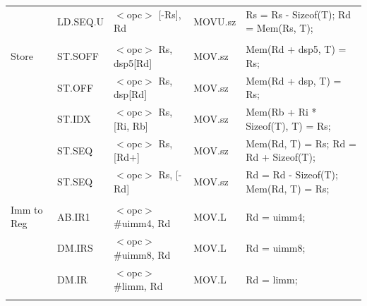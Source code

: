 \begin{table}
\begin{center}
\begin{tabular}{lllll}
                   & LD.SEQ.U          & $<$opc$>$ [-Rs], Rd                   & MOVU.sz           & Rs = Rs - Sizeof(T); Rd = Mem(Rs, T);                                         \\
                   &                   &                                       &                   &                                                                               \\
Store              & ST.SOFF           & $<$opc$>$ Rs, dsp5[Rd]                & MOV.sz            & Mem(Rd + dsp5, T) = Rs;                                                       \\
                   & ST.OFF            & $<$opc$>$ Rs, dsp[Rd]                 & MOV.sz            & Mem(Rd + dsp, T) = Rs;                                                        \\
                   & ST.IDX            & $<$opc$>$ Rs, [Ri, Rb]                & MOV.sz            & Mem(Rb + Ri * Sizeof(T), T) = Rs;                                             \\
                   & ST.SEQ            & $<$opc$>$ Rs, [Rd+]                   & MOV.sz            & Mem(Rd, T) = Rs; Rd = Rd + Sizeof(T);                                         \\
                   & ST.SEQ            & $<$opc$>$ Rs, [-Rd]                   & MOV.sz            & Rd = Rd - Sizeof(T); Mem(Rd, T) = Rs;                                         \\
                   &                   &                                       &                   &                                                                               \\
Imm to Reg         & AB.IR1            & $<$opc$>$ \#uimm4, Rd                 & MOV.L             & Rd = uimm4;                                                                   \\
                   & DM.IRS            & $<$opc$>$ \#uimm8, Rd                 & MOV.L             & Rd = uimm8;                                                                   \\
                   & DM.IR             & $<$opc$>$ \#limm, Rd                  & MOV.L             & Rd = limm;                                                                    \\
                   &                   &                                       &                   &                                                                               \\

\end{tabular}
\end{center}
\end{table}
